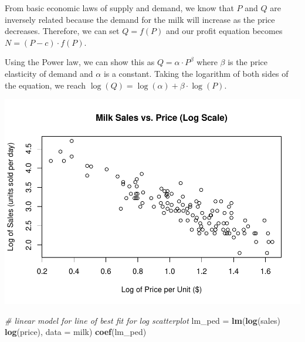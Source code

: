 \documentclass[]{article}
\newenvironment{Shaded}{\begin{snugshade}}{\end{snugshade}}
\newcommand{\CommentTok}[1]{\textcolor[rgb]{0.56,0.35,0.01}{\textit{#1}}}
\newcommand{\DataTypeTok}[1]{\textcolor[rgb]{0.13,0.29,0.53}{#1}}
\newcommand{\KeywordTok}[1]{\textcolor[rgb]{0.13,0.29,0.53}{\textbf{#1}}}
\newcommand{\NormalTok}[1]{#1}
\newcommand{\OperatorTok}[1]{\textcolor[rgb]{0.81,0.36,0.00}{\textbf{#1}}}
\newcommand{\StringTok}[1]{\textcolor[rgb]{0.31,0.60,0.02}{#1}}
\begin{document}
From basic economic laws of supply and demand, we know that \(P\) and
\(Q\) are inversely related because the demand for the milk will
increase as the price decreases. Therefore, we can set \(Q = f(P)\) and
our profit equation becomes \(N = (P - c) \cdot f(P)\).

Using the Power law, we can show this as \(Q = \alpha \cdot P^\beta\)
where \(\beta\) is the price elasticity of demand and \(\alpha\) is a
constant. Taking the logarithm of both sides of the equation, we reach
\(\log (Q) = \log (\alpha) + \beta \cdot \log (P)\).

\begin{Shaded}
\end{Shaded}

\includegraphics{Report_files/figure-latex/milk3-1.pdf}

\begin{Shaded}
\begin{Highlighting}[]
\CommentTok{# linear model for line of best fit for log scatterplot}
\NormalTok{lm_ped =}\StringTok{ }\KeywordTok{lm}\NormalTok{(}\KeywordTok{log}\NormalTok{(sales) }\OperatorTok{~}\StringTok{ }\KeywordTok{log}\NormalTok{(price), }\DataTypeTok{data =}\NormalTok{ milk)}
\KeywordTok{coef}\NormalTok{(lm_ped)}
\end{Highlighting}
\end{Shaded}
\end{document}
